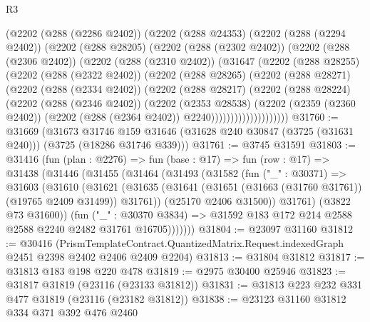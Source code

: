\begin{lexlean}{R3}
\begin{coremodule}
      (@2202
        (@288 (@2286 @2402))
        (@2202
          (@288 @24353)
          (@2202
            (@288 (@2294 @2402))
            (@2202
              (@288 @28205)
              (@2202
                (@288 (@2302 @2402))
                (@2202
                  (@288 (@2306 @2402))
                  (@2202
                    (@288 (@2310 @2402))
                    (@31647
                      (@2202
                        (@288 @28255)
                        (@2202
                          (@288 (@2322 @2402))
                          (@2202
                            (@288 @28265)
                            (@2202
                              (@288 @28271)
                              (@2202
                                (@288 (@2334 @2402))
                                (@2202
                                  (@288 @28217)
                                  (@2202
                                    (@288 @28224)
                                    (@2202
                                      (@288 (@2346 @2402))
                                      (@2202
                                        (@2353 @28538)
                                        (@2202
                                          (@2359 (@2360 @2402))
                                          (@2202 (@288 (@2364 @2402)) @2240))))))))))))))))))))
@31760 := @31669
    (@31673
      @31746
      @159
      @31646
      (@31628 @240 @30847 (@3725 (@31631 @240)))
      (@3725 (@18286 @31746 @339)))
@31761 := @3745 @31591
@31803 := @31416
    (fun (plan : @2276) =>
    fun (base : @17) =>
    fun (row : @17) =>
    @31438
      (@31446
        (@31455
          (@31464
            (@31493
              (@31582
                (fun ("_" : @30371) =>
                @31603
                  (@31610
                    (@31621
                      (@31635
                        (@31641 (@31651 (@31663 (@31760 @31761)) (@19765 @2409 @31499)) @31761))
                      (@25170 @2406 @31500))
                    @31761)
                  (@3822 @73 @31600))
                (fun ("_" : @30370 @3834) =>
                @31592 @183 @172 @214 @2588 @2588 @2240 @2482 @31761 @16705)))))))
@31804 := @23097 @31160
@31812 := @30416
    (PrismTemplateContract.QuantizedMatrix.Request.indexedGraph @2451 @2398 @2402 @2406 @2409 @2204)
@31813 := @31804 @31812
@31817 := @31813 @183 @198 @220 @478
@31819 := @2975 @30400 @25946
@31823 := @31817 @31819 (@23116 (@23133 @31812))
@31831 := @31813 @223 @232 @331 @477 @31819 (@23116 (@23182 @31812))
@31838 := @23123 @31160 @31812 @334 @371 @392 @476 @2460

\end{coremodule}
\end{lexlean}
